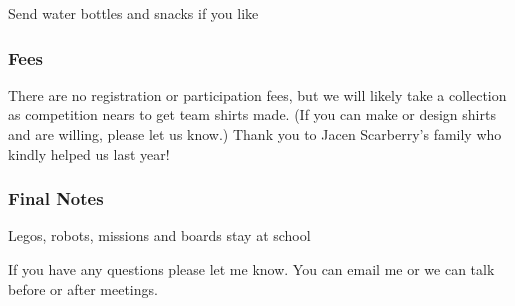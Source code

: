 Send water bottles and snacks if you like

\hypertarget{fees}{%
\subsubsection{Fees}\label{fees}}

There are no registration or participation fees, but we will likely take
a collection as competition nears to get team shirts made. (If you can
make or design shirts and are willing, please let us know.) Thank you to
Jacen Scarberry's family who kindly helped us last year!

\hypertarget{final-notes}{%
\subsubsection{Final Notes}\label{final-notes}}

Legos, robots, missions and boards stay at school

If you have any questions please let me know. You can email me or we can
talk before or after meetings.
